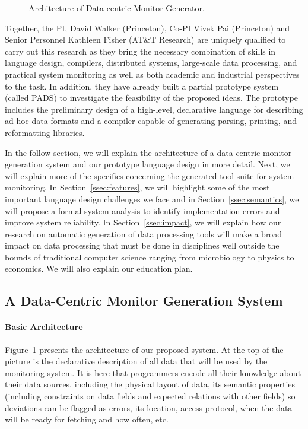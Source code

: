 \documentclass[10pt]{article}
\begin{document}
\begin{figure}[t]
\begin{center}
\centerline{}
\end{center}
\caption{\label{fig:arch} Architecture of Data-centric Monitor Generator.
}
\end{figure}

Together, the PI, David Walker (Princeton), Co-PI Vivek Pai
(Princeton) and Senior Personnel Kathleen Fisher (AT\&T Research) are
uniquely qualified to carry out this research as they bring the
necessary combination of skills in language design, compilers,
distributed systems, large-scale data processing, and practical system
monitoring as well as both academic and industrial perspectives to the
task.  In addition, they have already built a partial prototype system
(called PADS) to investigate the feasibility of the proposed ideas.
The prototype includes the preliminary design of a high-level, declarative
language for describing ad hoc data formats and a compiler capable of
generating parsing, printing, and reformatting libraries.

In the follow section, we will explain 
the architecture of a data-centric monitor generation system
and our prototype language design in more detail.  
Next, we will explain more of the specifics concerning
the generated tool suite for system monitoring.
In Section~\ref{ssec:features}, we will highlight some of the most
important language design challenges we face and
in Section~\ref{ssec:semantics}, we will propose a
formal system analysis to identify implementation errors
and improve system reliability.
In Section~\ref{ssec:impact}, we will explain how our research
on automatic generation of data processing tools
will make a broad impact on data processing that must be done
in disciplines well outside the bounds of
traditional computer science ranging from microbiology to physics to
economics.  We will also explain our education plan.

\subsection{A Data-Centric Monitor Generation System}

\paragraph*{Basic Architecture}
Figure~\ref{fig:arch} presents the architecture of our proposed
system.  At the top of the picture is the declarative description of all
data that will be used by the monitoring system.  It is here that
programmers encode all their knowledge about their data sources,
including the physical layout of data, its semantic properties
(including constraints on data fields and expected relations
with other fields) so deviations can be flagged as errors, 
its location, access protocol, when the data
will be ready for fetching and how often, etc.
\end{document}
